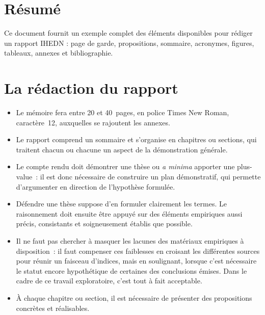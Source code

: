 \documentclass[12pt,a4paper]{article}
\begin{document}
\IhednTemplateCover

\section*{Résumé}
Ce document fournit un exemple complet des éléments disponibles pour rédiger un rapport IHEDN : page de garde, propositions, sommaire, acronymes, figures, tableaux, annexes et bibliographie.

\listofpropositions
\clearpage
\tableofcontents
\clearpage
\printglossary[type=\acronymtype,title={Liste des acronymes}]
\clearpage
{}
\clearpage
\listoffigures
\clearpage
{}
\begingroup
\makeatletter
\renewcommand{\@pnumwidth}{3em}
\makeatother
\listoftables
\endgroup
\clearpage
{}

\section{La rédaction du rapport}

\begin{itemize}
  \item Le mémoire fera entre 20 et 40~pages, en police Times New Roman, caractère~12, auxquelles se rajoutent les annexes.
  \item Le rapport comprend un sommaire et s'organise en chapitres ou sections, qui traitent chacun ou chacune un aspect de la démonstration générale.
  \item Le compte rendu doit démontrer une thèse ou \textit{a minima} apporter une plus-value~: il est donc nécessaire de construire un plan démonstratif, qui permette d'argumenter en direction de l'hypothèse formulée.
  \item Défendre une thèse suppose d'en formuler clairement les termes. Le raisonnement doit ensuite être appuyé sur des éléments empiriques aussi précis, consistants et soigneusement établis que possible.
  \item Il ne faut pas chercher à masquer les lacunes des matériaux empiriques à disposition~: il faut compenser ces faiblesses en croisant les différentes sources pour réunir un faisceau d'indices, mais en soulignant, lorsque c'est nécessaire le statut encore hypothétique de certaines des conclusions émises. Dans le cadre de ce travail exploratoire, c'est tout à fait acceptable.
  \item À chaque chapitre ou section, il est nécessaire de présenter des propositions concrètes et réalisables.
\end{itemize}
\end{document}
